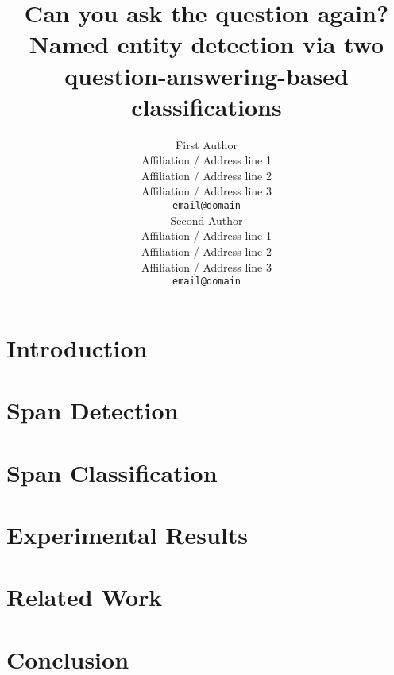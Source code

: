 \documentclass[11pt]{article}
\title{Can you ask the question again? Named entity detection via two question-answering-based classifications}
\author{First Author \\
  Affiliation / Address line 1 \\
  Affiliation / Address line 2 \\
  Affiliation / Address line 3 \\
  \texttt{email@domain} \\\And
  Second Author \\
  Affiliation / Address line 1 \\
  Affiliation / Address line 2 \\
  Affiliation / Address line 3 \\
  \texttt{email@domain} \\}
\begin{document}
\maketitle

\begin{abstract}

\end{abstract}

\section{Introduction}
\label{sec:intro}


\section{Span Detection}
\label{sec:span}


\section{Span Classification}
\label{sec:class}


\section{Experimental Results}
\label{sec:exp}


\section{Related Work}
\label{sec:related}


\section{Conclusion}





%


\end{document}
